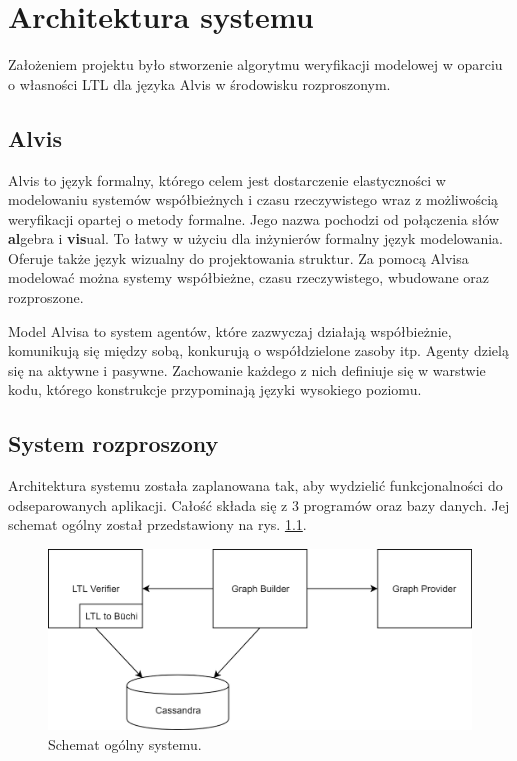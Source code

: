\chapter{Architektura systemu}

Założeniem projektu było stworzenie algorytmu weryfikacji modelowej w oparciu o własności LTL dla języka Alvis w środowisku rozproszonym.


\section{Alvis}

Alvis to język formalny, którego celem jest dostarczenie elastyczności w modelowaniu systemów współbieżnych i czasu rzeczywistego wraz z możliwością weryfikacji opartej o metody formalne.
Jego nazwa pochodzi od połączenia słów \textbf{al}gebra i \textbf{vis}ual.
To łatwy w użyciu dla inżynierów formalny język modelowania.
Oferuje także język wizualny do projektowania struktur.
Za pomocą Alvisa modelować można systemy współbieżne, czasu rzeczywistego, wbudowane oraz rozproszone.

Model Alvisa to system agentów, które zazwyczaj działają współbieżnie, komunikują się między sobą, konkurują o współdzielone zasoby itp.
Agenty dzielą się na aktywne i pasywne.
Zachowanie każdego z nich definiuje się w warstwie kodu, którego konstrukcje przypominają języki wysokiego poziomu.



\section{System rozproszony}

Architektura systemu została zaplanowana tak, aby wydzielić funkcjonalności do odseparowanych aplikacji.
Całość składa się z 3 programów oraz bazy danych.
Jej schemat ogólny został przedstawiony na rys. \ref{fig:system_overview}.

\begin{figure}[h]
    \centering
    \includegraphics[width=\linewidth,keepaspectratio]{img/system_overview.png}
    \caption{Schemat ogólny systemu.}
    \label{fig:system_overview}
\end{figure}

